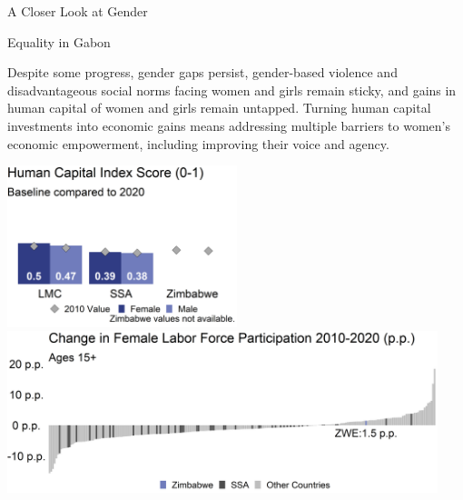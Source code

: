 \documentclass[
]{article}
\begin{document}
\begin{minipage}[c][1.4cm][t]{19.5cm}
\begin{minipage}[c][1.4cm][t]{6.5cm}
\fontsize{14}{1}\selectfont   
A Closer Look at Gender
  
\vspace{.2cm}
  
Equality in Gabon
\normalsize
\end{minipage}
\begin{minipage}[c][1.4cm][t]{12.75cm}
\fontsize{9}{8}\selectfont   
Despite some progress, gender gaps persist, gender-based violence and disadvantageous social norms facing women and girls remain sticky, and gains in human capital of women and girls remain untapped. Turning human capital investments into economic gains means addressing multiple barriers to women’s economic empowerment, including improving their voice and agency.
\normalsize
\end{minipage}
\end{minipage}

\vspace{.4cm}

\begin{minipage}[t][4.7cm][t]{19.5cm}
\href{https://genderdata.worldbank.org/indicators/hd-hci-ovrl}{\includegraphics[height=4.7cm]{HCIplot.png}}\hspace{.2cm}
\href{https://genderdata.worldbank.org/indicators/sl-tlf-acti-zs/}{\includegraphics[height=4.7cm]{LFPplot.png}}  
\end{minipage}

\vspace{.2cm}
\end{document}
